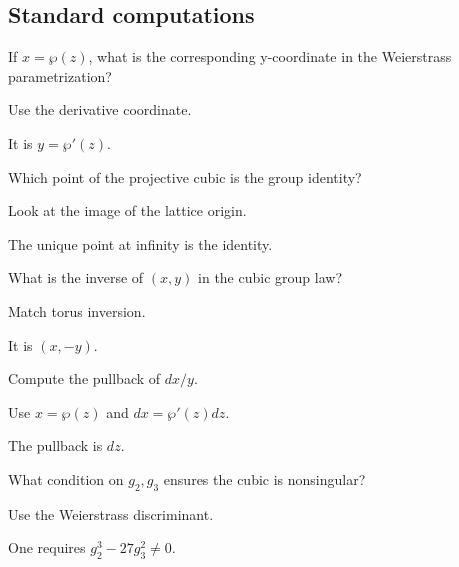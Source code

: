 \subsection*{Standard computations}

\begin{exercise}\label{exr:iv31-expand-01}
If \(x=\wp(z)\), what is the corresponding y-coordinate in the Weierstrass parametrization?
\end{exercise}
\begin{hint}
Use the derivative coordinate.
\end{hint}
\begin{solution}
It is \(y=\wp'(z)\).
\end{solution}

\begin{exercise}\label{exr:iv31-expand-02}
Which point of the projective cubic is the group identity?
\end{exercise}
\begin{hint}
Look at the image of the lattice origin.
\end{hint}
\begin{solution}
The unique point at infinity is the identity.
\end{solution}

\begin{exercise}[Inverse]\label{exr:iv31-expand-03}
What is the inverse of \((x,y)\) in the cubic group law?
\end{exercise}
\begin{hint}
Match torus inversion.
\end{hint}
\begin{solution}
It is \((x,-y)\).
\end{solution}

\begin{exercise}\label{exr:iv31-expand-04}
Compute the pullback of \(dx/y\).
\end{exercise}
\begin{hint}
Use \(x=\wp(z)\) and \(dx=\wp'(z)dz\).
\end{hint}
\begin{solution}
The pullback is \(dz\).
\end{solution}

\begin{exercise}\label{exr:iv31-expand-05}
What condition on \(g_2,g_3\) ensures the cubic is nonsingular?
\end{exercise}
\begin{hint}
Use the Weierstrass discriminant.
\end{hint}
\begin{solution}
One requires \(g_2^3-27g_3^2\ne0\).
\end{solution}

